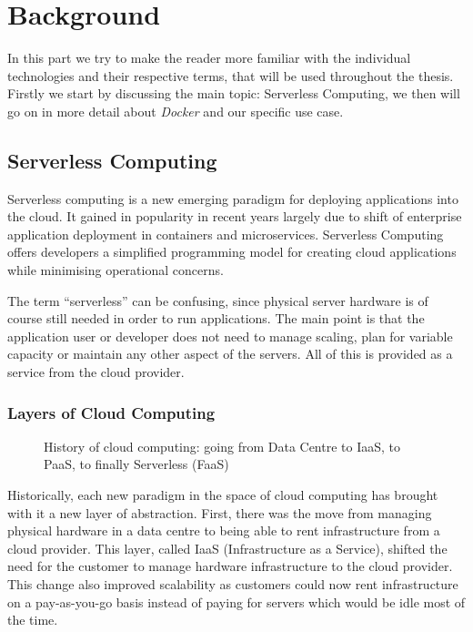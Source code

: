 \section{Background}

In this part we try to make the reader more familiar with the individual technologies and their
respective terms, that will be used throughout the thesis. Firstly we start by discussing the main
topic: Serverless Computing, we then will go on in more detail about \textit{Docker} and our
specific use case.

\subsection{Serverless Computing}

Serverless computing is a new emerging paradigm for deploying applications into the cloud. It gained
in popularity in recent years largely due to shift of enterprise application deployment in
containers and microservices. Serverless Computing offers developers a simplified programming model
for creating cloud applications while minimising operational concerns. \cite{servprog}

The term “serverless” can be confusing, since physical server hardware is of course still needed in
order to run applications. The main point is that the application user or developer does not need to
manage scaling, plan for variable capacity or maintain any other aspect of the servers. All of this
is provided as a service from the cloud provider. \cite{wikiservcomp}

\subsubsection{Layers of Cloud Computing}

\begin{figure}[H]
  \centering
  \caption{History of cloud computing: going from Data Centre to IaaS, to PaaS, to finally
  Serverless (FaaS) \cite{layercloudcomp}}
\end{figure}

Historically, each new paradigm in the space of cloud computing has brought with it a new layer of
abstraction. First, there was the move from managing physical hardware in a data centre to being
able to rent infrastructure from a cloud provider. This layer, called IaaS (Infrastructure as a
Service), shifted the need for the customer to manage hardware infrastructure to the cloud
provider. This change also improved scalability as customers could now rent infrastructure on a
pay-as-you-go basis instead of paying for servers which would be idle most of the time.

